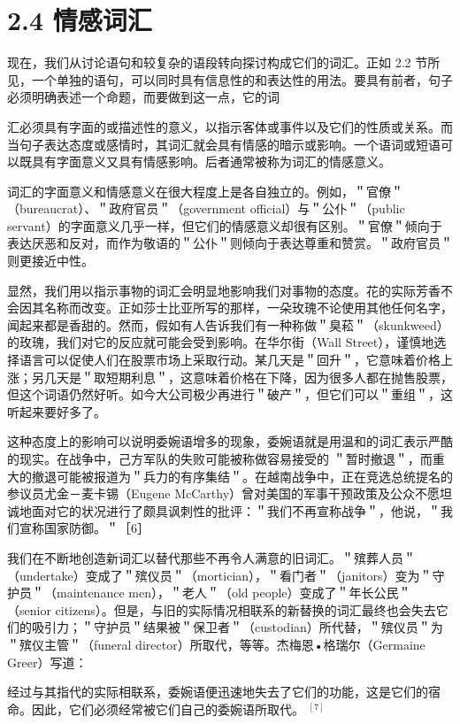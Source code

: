 \section*{2.4 情感词汇}
现在，我们从讨论语句和较复杂的语段转向探讨构成它们的词汇。正如 2.2 节所见，一个单独的语句，可以同时具有信息性的和表达性的用法。要具有前者，句子必须明确表述一个命题，而要做到这一点，它的词

汇必须具有字面的或描述性的意义，以指示客体或事件以及它们的性质或关系。而当句子表达态度或感情时，其词汇就会具有情感的暗示或影响。一个语词或短语可以既具有字面意义又具有情感影响。后者通常被称为词汇的情感意义。

词汇的字面意义和情感意义在很大程度上是各自独立的。例如，＂官僚＂（bureaucrat）、＂政府官员＂（government official）与＂公仆＂（public servant）的字面意义几乎一样，但它们的情感意义却很有区别。＂官僚＂倾向于表达厌恶和反对，而作为敬语的＂公仆＂则倾向于表达尊重和赞赏。＂政府官员＂则更接近中性。

显然，我们用以指示事物的词汇会明显地影响我们对事物的态度。花的实际芳香不会因其名称而改变。正如莎士比亚所写的那样，一朵玫瑰不论使用其他任何名字，闻起来都是香甜的。然而，假如有人告诉我们有一种称做＂臭菘＂（skunkweed）的玫瑰，我们对它的反应就可能会受到影响。在华尔街（Wall Street），谨慎地选择语言可以促使人们在股票市场上采取行动。某几天是＂回升＂，它意味着价格上涨；另几天是＂取短期利息＂，这意味着价格在下降，因为很多人都在抛售股票，但这个词语仍然好听。如今大公司极少再进行＂破产＂，但它们可以＂重组＂，这听起来要好多了。

这种态度上的影响可以说明委婉语增多的现象，委婉语就是用温和的词汇表示严酷的现实。在战争中，己方军队的失败可能被称做容易接受的 ＂暂时撤退＂，而重大的撤退可能被报道为＂兵力的有序集结＂。在越南战争中，正在竞选总统提名的参议员尤金－麦卡锡（Eugene McCarthy）曾对美国的军事干预政策及公众不愿坦诚地面对它的状况进行了颇具讽刺性的批评：＂我们不再宣称战争＂，他说，＂我们宣称国家防御。＂［6］

我们在不断地创造新词汇以替代那些不再令人满意的旧词汇。＂殡葬人员＂（undertake）变成了＂殡仪员＂（mortician），＂看门者＂（janitors）变为＂守护员＂（maintenance men），＂老人＂（old people）变成了＂年长公民＂（senior citizens）。但是，与旧的实际情况相联系的新替换的词汇最终也会失去它们的吸引力；＂守护员＂结果被＂保卫者＂（custodian）所代替，＂殡仪员＂为＂殡仪主管＂（funeral director）所取代，等等。杰梅恩•格瑞尔（Germaine Greer）写道：

\begin{displayquote}
经过与其指代的实际相联系，委婉语便迅速地失去了它们的功能，这是它们的宿命。因此，它们必须经常被它们自己的委婉语所取代。 ${ }^{[7]}$
\end{displayquote}

